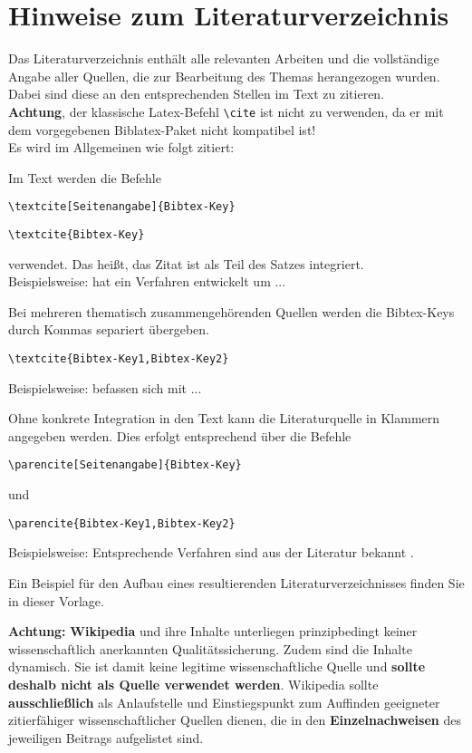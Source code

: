 \section{Hinweise zum Literaturverzeichnis}
\label{hinweise:literaturverzeichnis}

Das Literaturverzeichnis enthält alle relevanten Arbeiten und  die vollständige Angabe aller
Quellen, die zur Bearbeitung des Themas herangezogen wurden. Dabei
sind diese an den entsprechenden Stellen im Text zu zitieren. \\

\textbf{Achtung}, der klassische Latex-Befehl \texttt{\textbackslash cite} ist nicht zu verwenden, da er mit dem vorgegebenen Biblatex-Paket nicht kompatibel ist! \\

Es wird im Allgemeinen wie folgt zitiert:

Im Text werden die Befehle 
\begin{verbatim}\textcite[Seitenangabe]{Bibtex-Key}\end{verbatim}
\begin{verbatim}\textcite{Bibtex-Key}\end{verbatim}
verwendet. Das heißt, das Zitat ist als Teil des Satzes integriert.\\
Beispielsweise: \textcite[S. 123 ff.]{Book3} hat ein Verfahren entwickelt um ... 

Bei mehreren thematisch zusammengehörenden Quellen werden die Bibtex-Keys durch Kommas separiert übergeben.
\begin{verbatim}\textcite{Bibtex-Key1,Bibtex-Key2}\end{verbatim} 
Beispielsweise: \textcite{Book3, InProc4} befassen sich mit ...

Ohne konkrete Integration in den Text kann die Literaturquelle in Klammern angegeben werden. Dies erfolgt entsprechend über die Befehle 
\begin{verbatim}\parencite[Seitenangabe]{Bibtex-Key}\end{verbatim} 
und 
\begin{verbatim}\parencite{Bibtex-Key1,Bibtex-Key2}\end{verbatim} 
Beispielsweise: Entsprechende Verfahren sind aus der Literatur bekannt \parencite{Book3,InProc4}.

Ein Beispiel für den Aufbau eines resultierenden Literaturverzeichnisses finden Sie in dieser Vorlage.

\textbf{Achtung:} \textbf{Wikipedia} und ihre Inhalte unterliegen prinzipbedingt keiner wissenschaftlich anerkannten Qualitätssicherung. Zudem sind die Inhalte dynamisch. Sie ist damit keine legitime wissenschaftliche Quelle und \textbf{sollte deshalb nicht als Quelle verwendet werden}. Wikipedia sollte \textbf{ausschließlich} als Anlaufstelle und Einstiegspunkt zum Auffinden geeigneter zitierfähiger wissenschaftlicher Quellen dienen, die in den \textbf{Einzelnachweisen} des jeweiligen Beitrags aufgelistet sind. 

